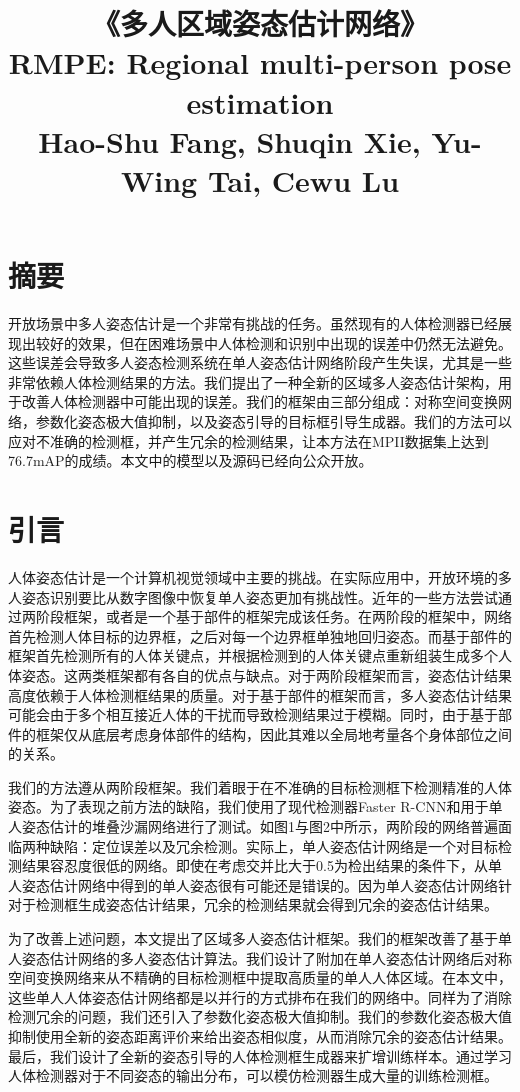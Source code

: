 \title{《多人区域姿态估计网络》\\ 
	RMPE: Regional multi-person pose estimation\\
	{\wuhao Hao-Shu Fang, Shuqin Xie, Yu-Wing Tai, Cewu Lu}\\
}
\section*{摘要}
开放场景中多人姿态估计是一个非常有挑战的任务。虽然现有的人体检测器已经展现出较好的效果，但在困难场景中人体检测和识别中出现的误差中仍然无法避免。这些误差会导致多人姿态检测系统在单人姿态估计网络阶段产生失误，尤其是一些非常依赖人体检测结果的方法。我们提出了一种全新的区域多人姿态估计架构，用于改善人体检测器中可能出现的误差。我们的框架由三部分组成：对称空间变换网络，参数化姿态极大值抑制，以及姿态引导的目标框引导生成器。我们的方法可以应对不准确的检测框，并产生冗余的检测结果，让本方法在MPII数据集上达到76.7mAP的成绩。本文中的模型以及源码已经向公众开放。

\section*{引言}
人体姿态估计是一个计算机视觉领域中主要的挑战。在实际应用中，开放环境的多人姿态识别要比从数字图像中恢复单人姿态更加有挑战性。近年的一些方法尝试通过两阶段框架，或者是一个基于部件的框架完成该任务。在两阶段的框架中，网络首先检测人体目标的边界框，之后对每一个边界框单独地回归姿态。而基于部件的框架首先检测所有的人体关键点，并根据检测到的人体关键点重新组装生成多个人体姿态。这两类框架都有各自的优点与缺点。对于两阶段框架而言，姿态估计结果高度依赖于人体检测框结果的质量。对于基于部件的框架而言，多人姿态估计结果可能会由于多个相互接近人体的干扰而导致检测结果过于模糊。同时，由于基于部件的框架仅从底层考虑身体部件的结构，因此其难以全局地考量各个身体部位之间的关系。

我们的方法遵从两阶段框架。我们着眼于在不准确的目标检测框下检测精准的人体姿态。为了表现之前方法的缺陷，我们使用了现代检测器Faster R-CNN和用于单人姿态估计的堆叠沙漏网络进行了测试。如图1与图2中所示，两阶段的网络普遍面临两种缺陷：定位误差以及冗余检测。实际上，单人姿态估计网络是一个对目标检测结果容忍度很低的网络。即使在考虑交并比大于0.5为检出结果的条件下，从单人姿态估计网络中得到的单人姿态很有可能还是错误的。因为单人姿态估计网络针对于检测框生成姿态估计结果，冗余的检测结果就会得到冗余的姿态估计结果。

为了改善上述问题，本文提出了区域多人姿态估计框架。我们的框架改善了基于单人姿态估计网络的多人姿态估计算法。我们设计了附加在单人姿态估计网络后对称空间变换网络来从不精确的目标检测框中提取高质量的单人人体区域。在本文中，这些单人人体姿态估计网络都是以并行的方式排布在我们的网络中。同样为了消除检测冗余的问题，我们还引入了参数化姿态极大值抑制。我们的参数化姿态极大值抑制使用全新的姿态距离评价来给出姿态相似度，从而消除冗余的姿态估计结果。最后，我们设计了全新的姿态引导的人体检测框生成器来扩增训练样本。通过学习人体检测器对于不同姿态的输出分布，可以模仿检测器生成大量的训练检测框。

